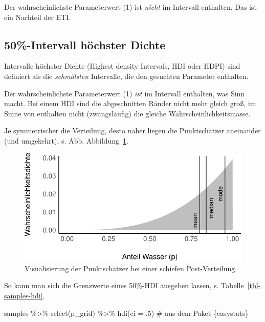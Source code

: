 \documentclass[
  a4paper,
  DIV=11]{scrreprt}
\newenvironment{Shaded}{\begin{snugshade}}{\end{snugshade}}
\newcommand{\AttributeTok}[1]{\textcolor[rgb]{0.40,0.45,0.13}{#1}}
\newcommand{\CommentTok}[1]{\textcolor[rgb]{0.37,0.37,0.37}{#1}}
\newcommand{\DecValTok}[1]{\textcolor[rgb]{0.68,0.00,0.00}{#1}}
\newcommand{\FunctionTok}[1]{\textcolor[rgb]{0.28,0.35,0.67}{#1}}
\newcommand{\NormalTok}[1]{\textcolor[rgb]{0.00,0.23,0.31}{#1}}
\newcommand{\SpecialCharTok}[1]{\textcolor[rgb]{0.37,0.37,0.37}{#1}}
\theoremstyle{definition}
\theoremstyle{remark}
\begin{document}
Der wahrscheinlichste Parameterwert (1) ist \emph{nicht} im Intervall
enthalten. Das ist ein Nachteil der ETI.

\hypertarget{intervall-huxf6chster-dichte}{%
\subsection{50\%-Intervall höchster
Dichte}\label{intervall-huxf6chster-dichte}}

Intervalle höchster Dichte (Highest density Intervals, HDI oder HDPI)
sind definiert als die \emph{schmälsten} Intervalle, die den gesuchten
Parameter enthalten.

Der wahrscheinlichste Parameterwert (1) \emph{ist} im Intervall
enthalten, was Sinn macht. Bei einem HDI sind die abgeschnitten Ränder
nicht mehr gleich groß, im Sinne von enthalten nicht (zwangsläufig) die
gleiche Wahrscheinlichkeitsmasse.

Je symmetrischer die Verteilung, desto näher liegen die Punktschätzer
aneinander (und umgekehrt), s. Abb.
Abbildung~\ref{fig-post-pointestimates}.

\begin{figure}

{\centering \includegraphics{./Post_files/figure-pdf/fig-post-pointestimates-1.pdf}

}

\caption{\label{fig-post-pointestimates}Visualisierung der Punktschätzer
bei einer schiefen Post-Verteilung}

\end{figure}

So kann man sich die Grenzwerte eines 50\%-HDI ausgeben lassen, s.
Tabelle~\ref{tbl-samples-hdi}.

\begin{Shaded}
\begin{Highlighting}[]
\NormalTok{samples }\SpecialCharTok{\%\textgreater{}\%} 
  \FunctionTok{select}\NormalTok{(p\_grid) }\SpecialCharTok{\%\textgreater{}\%} 
  \FunctionTok{hdi}\NormalTok{(}\AttributeTok{ci =}\NormalTok{ .}\DecValTok{5}\NormalTok{)  }\CommentTok{\# aus dem Paket \textasciigrave{}\{easystats\}\textasciigrave{}}
\end{Highlighting}
\end{Shaded}
\end{document}
